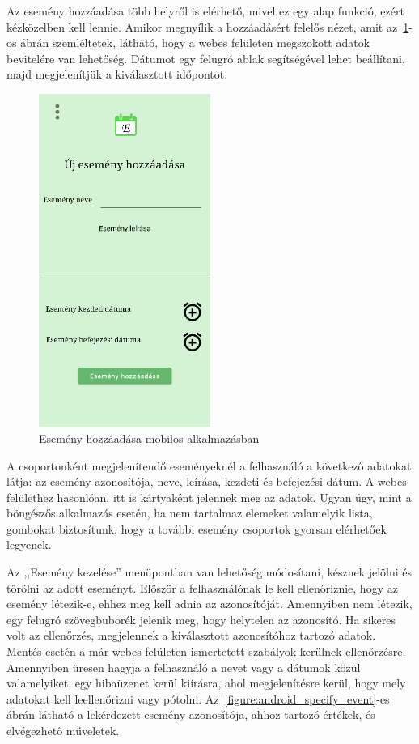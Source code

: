 \documentclass[
]{thesis-ekf}
\theoremstyle{definition}
\theoremstyle{remark}
\begin{document}
	Az esemény hozzáadása több helyről is elérhető, mivel ez egy alap funkció, ezért kézközelben kell lennie. Amikor megnyílik a hozzáadásért felelős nézet, amit az~\ref{figure:androidapp_add_event}-os ábrán szemléltetek, látható, hogy a webes felületen megszokott adatok bevitelére van lehetőség. Dátumot egy felugró ablak segítségével lehet beállítani, majd megjelenítjük a kiválasztott időpontot. 
	
	\begin{figure}[ht!]
		\centering
		\includegraphics[width=0.5\textwidth]{android_app/android_add_event}
		\caption{Esemény hozzáadása mobilos alkalmazásban}
		\label{figure:androidapp_add_event}
	\end{figure}
	
	A csoportonként megjelenítendő eseményeknél a felhasználó a következő adatokat látja: az esemény azonosítója, neve, leírása, kezdeti és befejezési dátum. A webes felülethez hasonlóan, itt is kártyaként jelennek meg az adatok. Ugyan úgy, mint a böngészős alkalmazás esetén, ha nem tartalmaz elemeket valamelyik lista, gombokat biztosítunk, hogy a további esemény csoportok gyorsan elérhetőek legyenek.
	
	Az ,,Esemény kezelése'' menüpontban van lehetőség módosítani, késznek jelölni és törölni az adott eseményt. Először a felhasználónak le kell ellenőriznie, hogy az esemény létezik-e, ehhez meg kell adnia az azonosítóját. Amennyiben nem létezik, egy felugró szövegbuborék jelenik meg, hogy helytelen az azonosító. Ha sikeres volt az ellenőrzés, megjelennek a kiválasztott azonosítóhoz tartozó adatok. Mentés esetén a már webes felületen ismertetett szabályok kerülnek ellenőrzésre. Amennyiben üresen hagyja a felhasználó a nevet vagy a dátumok közül valamelyiket, egy hibaüzenet kerül kiírásra, ahol megjelenítésre kerül, hogy mely adatokat kell leellenőrizni vagy pótolni. Az~\ref{figure:android_specify_event}-es ábrán látható a lekérdezett esemény azonosítója, ahhoz tartozó értékek, és elvégezhető műveletek. 
	
\end{document}
